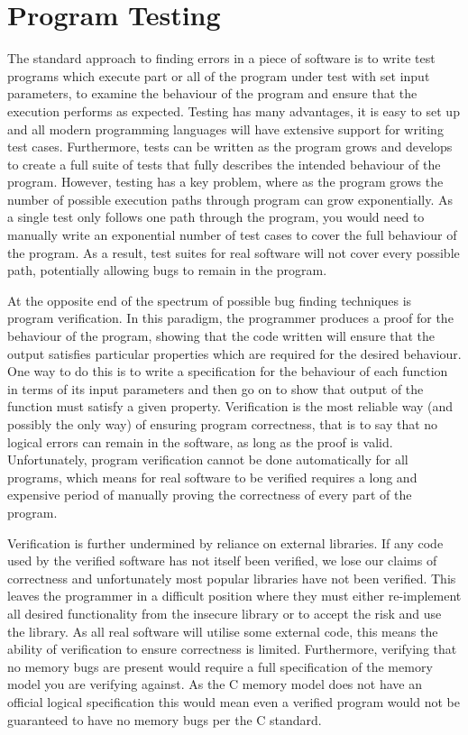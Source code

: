 \documentclass[12pt,twoside]{report}
\begin{document}
\section{Program Testing}
The standard approach to finding errors in a piece of software is to write test programs which execute part or all of the program under test with set input parameters, to examine the behaviour of the program and ensure that the execution performs as expected. Testing has many advantages, it is easy to set up and all modern programming languages will have extensive support for writing test cases. Furthermore, tests can be written as the program grows and develops to create a full suite of tests that fully describes the intended behaviour of the program. However, testing has a key problem, where as the program grows the number of possible execution paths through program can grow exponentially. As a single test only follows one path through the program, you would need to manually write an exponential number of test cases to cover the full behaviour of the program. As a result, test suites for real software will not cover every possible path, potentially allowing bugs to remain in the program.

At the opposite end of the spectrum of possible bug finding techniques is program verification. In this paradigm, the programmer produces a proof for the behaviour of the program, showing that the code written will ensure that the output satisfies particular properties which are required for the desired behaviour. One way to do this is to write a specification for the behaviour of each function in terms of its input parameters and then go on to show that output of the function must satisfy a given property. Verification is the most reliable way (and possibly the only way) of ensuring program correctness, that is to say that no logical errors can remain in the software, as long as the proof is valid. Unfortunately, program verification cannot be done automatically for all programs, which means for real software to be verified requires a long and expensive period of manually proving the correctness of every part of the program.

Verification is further undermined by reliance on external libraries. If any code used by the verified software has not itself been verified, we lose our claims of correctness and unfortunately most popular libraries have not been verified. This leaves the programmer in a difficult position where they must either re-implement all desired functionality from the insecure library or to accept the risk and use the library. As all real software will utilise some external code, this means the ability of verification to ensure correctness is limited. Furthermore, verifying that no memory bugs are present would require a full specification of the memory model you are verifying against. As the C memory model does not have an official logical specification this would mean even a verified program would not be guaranteed to have no memory bugs per the C standard.
\end{document}
